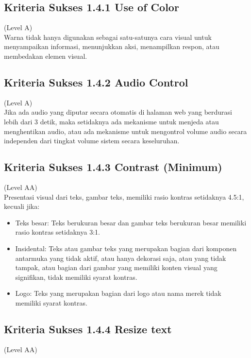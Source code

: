 \subsection{Kriteria Sukses 1.4.1 Use of Color}
\label{subsec:kriteria_1.4.1}
(Level A) \\

Warna tidak hanya digunakan sebagai satu-satunya cara visual untuk menyampaikan informasi, menunjukkan aksi, menampilkan respon, atau membedakan elemen visual.


\subsection{Kriteria Sukses 1.4.2 Audio Control}
\label{subsec:kriteria_1.4.2}
(Level A) \\

Jika ada audio yang diputar secara otomatis di halaman web yang berdurasi lebih dari 3 detik, maka setidaknya ada mekanisme untuk menjeda atau menghentikan audio, atau ada mekanisme untuk mengontrol volume audio secara independen dari tingkat volume sistem secara keseluruhan.


\subsection{Kriteria Sukses 1.4.3 Contrast (Minimum)}
\label{subsec:kriteria_1.4.3}
(Level AA) \\

Presentasi visual dari teks, gambar teks, memiliki rasio kontras setidaknya 4.5:1, kecuali jika:

\begin{itemize}
	\item Teks besar: Teks berukuran besar dan gambar teks berukuran besar memiliki rasio kontras setidaknya 3:1.
	\item Insidental: Teks atau gambar teks yang merupakan bagian dari komponen antarmuka yang tidak aktif, atau hanya dekorasi saja, atau yang tidak tampak, atau bagian dari gambar yang memiliki konten visual yang signifikan, tidak memiliki syarat kontras.
	\item Logo: Teks yang merupakan bagian dari logo atau nama merek tidak memiliki syarat kontras.
\end{itemize}

\subsection{Kriteria Sukses 1.4.4 Resize text}
\label{subsec:kriteria_1.4.4}
(Level AA) \\

